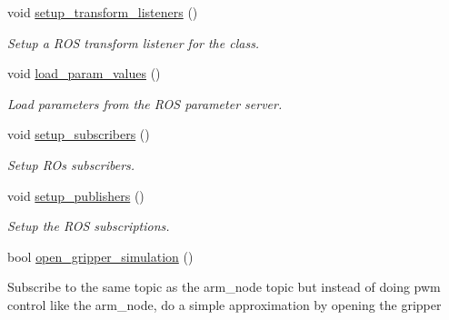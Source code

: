 \begin{DoxyCompactItemize}
void \hyperlink{classgo__motion__planner_a88298290e78a2b4445d7026785d04760}{setup\+\_\+transform\+\_\+listeners} ()
\begin{DoxyCompactList}\small\item\em Setup a R\+OS transform listener for the class. \end{DoxyCompactList}\item 
\mbox{\label{classgo__motion__planner_a364274097d4ea459a6e18a17852e9704}} 
void \hyperlink{classgo__motion__planner_a364274097d4ea459a6e18a17852e9704}{load\+\_\+param\+\_\+values} ()
\begin{DoxyCompactList}\small\item\em Load parameters from the R\+OS parameter server. \end{DoxyCompactList}\item 
\mbox{\label{classgo__motion__planner_a49672ad780c9c66c554672b2ecf8bd78}} 
void \hyperlink{classgo__motion__planner_a49672ad780c9c66c554672b2ecf8bd78}{setup\+\_\+subscribers} ()
\begin{DoxyCompactList}\small\item\em Setup R\+Os subscribers. \end{DoxyCompactList}\item 
\mbox{\label{classgo__motion__planner_ac994e145558bda267ac29ea6feb9981a}} 
void \hyperlink{classgo__motion__planner_ac994e145558bda267ac29ea6feb9981a}{setup\+\_\+publishers} ()
\begin{DoxyCompactList}\small\item\em Setup the R\+OS subscriptions. \end{DoxyCompactList}\item 
\mbox{\label{classgo__motion__planner_a9248ea5b2727f984761ea7bbaea3ba5c}} 
bool \hyperlink{classgo__motion__planner_a9248ea5b2727f984761ea7bbaea3ba5c}{open\+\_\+gripper\+\_\+simulation} ()
\begin{DoxyCompactList}\small\item\em 
\begin{DoxyItemize}
\item Subscribe to the same topic as the arm\+\_\+node topic but instead of doing pwm control like the arm\+\_\+node, do a simple approximation by opening the gripper 
\end{DoxyItemize}\end{DoxyCompactList}\item 

\end{DoxyCompactItemize}
